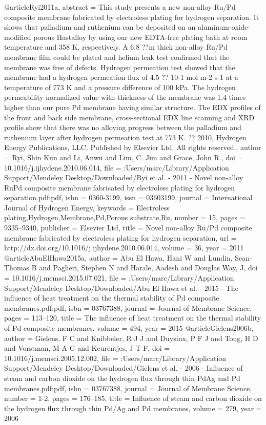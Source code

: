 @article{Ryi2011a,
abstract = {This study presents a new non-alloy Ru/Pd composite membrane fabricated by electroless plating for hydrogen separation. It shows that palladium and ruthenium can be deposited on an aluminum-oxide-modified porous Hastalloy by using our new EDTA-free plating bath at room temperature and 358 K, respectively. A 6.8 ??m thick non-alloy Ru/Pd membrane film could be plated and helium leak test confirmed that the membrane was free of defects. Hydrogen permeation test showed that the membrane had a hydrogen permeation flux of 4.5 ?? 10-1 mol m-2 s-1 at a temperature of 773 K and a pressure difference of 100 kPa. The hydrogen permeability normalized value with thickness of the membrane was 1.4 times higher than our pure Pd membrane having similar structure. The EDX profiles of the front and back side membrane, cross-sectional EDX line scanning and XRD profile show that there was no alloying progress between the palladium and ruthenium layer after hydrogen permeation test at 773 K. ?? 2010, Hydrogen Energy Publications, LLC. Published by Elsevier Ltd. All rights reserved.},
author = {Ryi, Shin Kun and Li, Anwu and Lim, C. Jim and Grace, John R.},
doi = {10.1016/j.ijhydene.2010.06.014},
file = {:Users/marc/Library/Application Support/Mendeley Desktop/Downloaded/Ryi et al. - 2011 - Novel non-alloy RuPd composite membrane fabricated by electroless plating for hydrogen separation.pdf:pdf},
isbn = {0360-3199},
issn = {03603199},
journal = {International Journal of Hydrogen Energy},
keywords = {Electroless plating,Hydrogen,Membrane,Pd,Porous substrate,Ru},
number = {15},
pages = {9335--9340},
publisher = {Elsevier Ltd},
title = {{Novel non-alloy Ru/Pd composite membrane fabricated by electroless plating for hydrogen separation}},
url = {http://dx.doi.org/10.1016/j.ijhydene.2010.06.014},
volume = {36},
year = {2011}
}
@article{AbuElHawa2015a,
author = {{Abu El Hawa}, Hani W and Lundin, Sean-Thomas B and Paglieri, Stephen N and Harale, Aadesh and {Douglas Way}, J},
doi = {10.1016/j.memsci.2015.07.021},
file = {:Users/marc/Library/Application Support/Mendeley Desktop/Downloaded/Abu El Hawa et al. - 2015 - The influence of heat treatment on the thermal stability of Pd composite membranes.pdf:pdf},
isbn = {03767388},
journal = {Journal of Membrane Science},
pages = {113--120},
title = {{The influence of heat treatment on the thermal stability of Pd composite membranes}},
volume = {494},
year = {2015}
}
@article{Gielens2006b,
author = {Gielens, F C and Knibbeler, R J J and Duysinx, P F J and Tong, H D and Vorstman, M A G and Keurentjes, J T F},
doi = {10.1016/j.memsci.2005.12.002},
file = {:Users/marc/Library/Application Support/Mendeley Desktop/Downloaded/Gielens et al. - 2006 - Influence of steam and carbon dioxide on the hydrogen flux through thin PdAg and Pd membranes.pdf:pdf},
isbn = {03767388},
journal = {Journal of Membrane Science},
number = {1-2},
pages = {176--185},
title = {{Influence of steam and carbon dioxide on the hydrogen flux through thin Pd/Ag and Pd membranes}},
volume = {279},
year = {2006}
}
